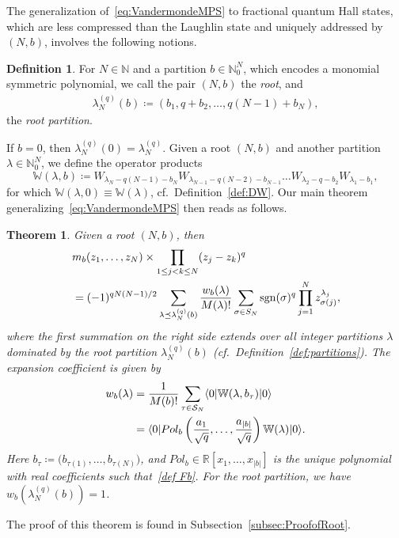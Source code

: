 \documentclass[letterpaper, DIV=17]{scrartcl}
\newtheorem{theorem}{Theorem}[section]  %
\numberwithin{equation}{section}
\theoremstyle{definition}
\newtheorem{defn}{Definition}[section]
\newcommand{\pol}{Pol}
\begin{document}
			
			The generalization of~\eqref{eq:VandermondeMPS} to fractional quantum Hall states,  which are less compressed than the Laughlin state and uniquely addressed by $ (N,b) $, involves the following notions.
			\begin{defn}\label{def:rootp}
			For $ N \in \mathbb{N} $ and a partition $ b  \in \mathbb{N}_0^N $, which encodes a monomial symmetric polynomial, we call the pair $(N,b) $ the \emph{root}, and 			
			\begin{align*}
				\lambda^{(q)}_N(b )\coloneqq (b_1, q +b_2,  \dots, q(N-1)+b_N) ,
			\end{align*}
			the \emph{root partition}.
			\end{defn}	
			If $ b = 0 $, then $ \lambda^{(q)}_N(0)= \lambda^{(q)}_N $. 
			Given a root $ (N,b) $ and another partition $ \lambda \in \mathbb{N}_0^N $, we define the operator products
			\begin{equation}\label{def:Wwithb}
			\mathbb{W}(\lambda,b) \coloneqq W_{\lambda_N-q(N-1)-b_N} W_{\lambda_{N-1}-q(N-2)-b_{N-1}} \dots W_{\lambda_2 - q-b_2} W_{\lambda_1-b_1}  ,
			\end{equation}
			for which $\mathbb{W}(\lambda,0)\equiv \mathbb{W}(\lambda) $, cf.\ Definition~\ref{def:DW}.  Our main theorem generalizing~\eqref{eq:VandermondeMPS} 
			then reads as follows. 
\begin{theorem} \label{thm:root states}
			Given a root $ (N,b) $, then
			\begin{align} \label{MPS with monomial symmetric}
					&m_{b}(z_1, \dots, z_N) \times \prod_{1\leq j<k\leq N} (z_j-z_k)^q \notag \\
					& = (-1)^{qN(N-1)/2}  \sum_{\lambda \preceq \lambda^{(q)}_N(b)} \frac{  w_b(\lambda) }{ M(\lambda)!}  \sum_{\sigma\in S_N} \mathrm{sgn}(\sigma)^q \prod_{j=1}^N z_{\sigma(j)}^{\lambda_j},  
			\end{align}
			where the first summation on the right side extends over all integer partitions $ \lambda $ dominated by the root partition $ \lambda^{(q)}_N(b ) $ (cf.~Definition~\ref{def:partitions}). The expansion coefficient is given by
				\begin{align} \label{MPS with monomial symmetric_c}
			w_b(\lambda) & = \frac{1}{ M(b)!}  \sum_{\tau \in \mathcal{S}_N}  \langle 0 \vert \mathbb{W}(\lambda,b_\tau)\vert 0 \rangle  \notag \\ 
			& = \langle 0 \vert \pol_{b}\left(\frac{a_1}{\sqrt{q}} , \dots, \frac{a_{\vert b \vert}}{\sqrt{q}} \right) \mathbb{W}(\lambda) \vert 0 \rangle .
				\end{align}
			Here $ b_\tau \coloneqq \big(b_{\tau(1)}, \dots , b_{\tau(N)}\big) $, and $\pol_{b}\in \mathbb{R}[x_1, \dots, x_{\vert b\vert}]$ is the unique polynomial with real coefficients such that~\eqref{def Fb}. 
			For the root partition, we have $ w_b( \lambda^{(q)}_N(b)) = 1 $. 
			\end{theorem}
The proof of this theorem is found in Subsection~\ref{subsec:ProofofRoot}.
\end{document}
